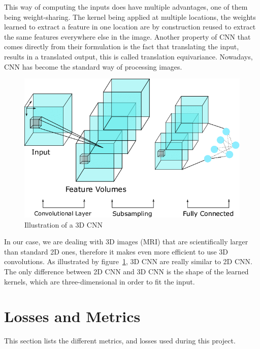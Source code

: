 This way of computing the inputs does have multiple advantages, one of them being weight-sharing. The kernel being applied at multiple locations, the weights learned to extract a feature in one location are by construction reused to extract the same features everywhere else in the image. Another property of CNN that comes directly from their formulation is the fact that translating the input, results in a translated output, this is called translation equivariance. Nowadays, CNN has become the standard way of processing images.
\begin{figure}
 \centering
 \includegraphics[width=.9\linewidth]{figures/3D_CNN_example.png}
 \captionsetup{width=.9\linewidth}
 \caption[3D_CNN_example]{Illustration\footnotemark{} of a 3D CNN}
 \label{fig:3d_cnn_example}
\end{figure}


In our case, we are dealing with 3D images (MRI) that are scientifically larger than standard 2D ones, therefore it makes even more efficient to use 3D convolutions. As illustrated by figure~\ref{fig:3d_cnn_example}, 3D CNN are really similar to 2D CNN. The only difference between 2D CNN and 3D CNN is the shape of the learned kernels, which are three-dimensional in order to fit the input.


\section{Losses and Metrics}
\label{sec:losses_metrics}
This section lists the different metrics, and losses used during this project.


